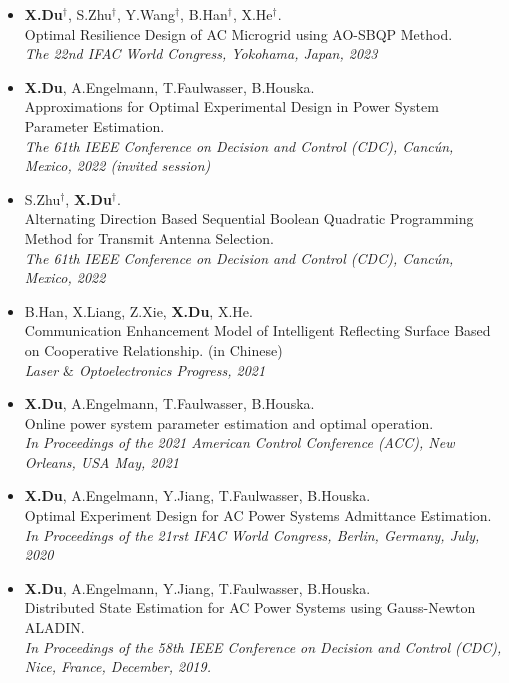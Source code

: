 \documentclass[paper=a4,fontsize=11pt]{scrartcl} %
\begin{document}
\begin{itemize}
	
		\item  {\textbf{X.Du}$^{\dag}$, S.Zhu$^{\dag}$, Y.Wang$^{\dag}$, B.Han$^{\dag}$, X.He$^{\dag}$. \\
		{Optimal Resilience Design of AC Microgrid using AO-SBQP Method.}\\
		\emph{The 22nd IFAC World Congress, Yokohama, Japan, 2023
	} }
	
		\item  { \textbf{X.Du}, A.Engelmann, T.Faulwasser, B.Houska. \\
		{Approximations for Optimal Experimental Design
			in Power System Parameter Estimation. }\\
		\emph{ The 61th IEEE Conference on Decision and Control (CDC), Canc\'un, Mexico, 2022 (invited session)
		} }
	
	
	\item  { S.Zhu$^{\dag}$, \textbf{X.Du}$^{\dag}$. \\
		{Alternating Direction Based Sequential Boolean Quadratic Programming Method for Transmit Antenna Selection.}\\
		\emph{ The 61th IEEE Conference on Decision and Control (CDC), Canc\'un, Mexico, 2022
	} }
	
		\item  { B.Han, X.Liang, Z.Xie, \textbf{X.Du}, X.He. \\
		{Communication Enhancement Model of Intelligent Reflecting Surface Based on Cooperative Relationship. (in Chinese)}\\
		\emph{Laser $\&$ Optoelectronics Progress, 2021
	} }
	
	\item  { \textbf{X.Du}, A.Engelmann, T.Faulwasser, B.Houska. \\
		{Online power system parameter estimation and optimal operation.}\\
		\emph{In Proceedings of the 2021 American Control Conference (ACC), New Orleans, USA May, 2021
	} }
	
		\item  {\textbf{X.Du}, A.Engelmann, Y.Jiang, T.Faulwasser, B.Houska. \\
		Optimal Experiment Design for AC Power Systems Admittance Estimation.\\
		\emph{In Proceedings of the 21rst IFAC World Congress, Berlin, Germany, July, 2020
		} }
	
	\item  {\textbf{X.Du}, A.Engelmann, Y.Jiang, T.Faulwasser, B.Houska. \\
		Distributed State Estimation for AC Power Systems using Gauss-Newton ALADIN. \\
		 \emph{In Proceedings of the 58th IEEE Conference on Decision and Control (CDC),
		Nice, France, December, 2019.} }
\end{itemize}
\end{document}
